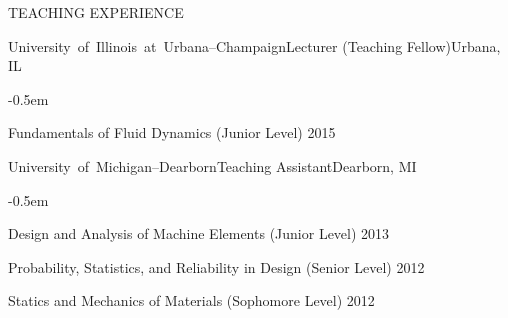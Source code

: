 \documentclass{resume} %
\newcommand{\sepss}{-0.5em}
\newcommand\UIUC{\mbox{University of Illinois at Urbana--Champaign}}
\newcommand\UMD{\mbox{University of Michigan--Dearborn}}
\begin{document}
\begin{rSection}{{\Large T}EACHING EXPERIENCE}


\begin{rSubsections}{\UIUC}{}{Lecturer (Teaching Fellow)}{Urbana, IL} \\
	\begin{list}{\textbullet}{\leftmargin=2.5em} 
	  	\itemsep \sepss 
	  	\vspace{-2em} 
        \item Fundamentals of Fluid Dynamics (Junior Level) \hfill 2015
  	\end{list}
\end{rSubsections}

\begin{rSubsections}{\UMD}{}{Teaching Assistant}{Dearborn, MI} \\
	\begin{list}{\textbullet}{\leftmargin=2.5em} 
	  	\itemsep \sepss 
	  	\vspace{-2em} 
        \item Design and Analysis of Machine Elements (Junior Level)            \hfill {2013}
        \item Probability, Statistics, and Reliability in Design (Senior Level) \hfill {2012}
        \item Statics and Mechanics of Materials (Sophomore Level)              \hfill {2012}
  	\end{list}
\end{rSubsections}

\end{rSection}
\end{document}

